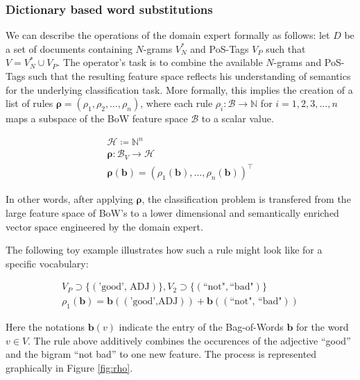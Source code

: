  
 

\subsubsection{Dictionary based word substitutions}

We can describe the operations of the domain expert formally as follows:
let $D$ be a set of documents containing $N$-grams $V_N^*$ and
PoS-Tags $V_P$ such that $V = V_N^* \cup V_P$.
The operator's task is to combine the available $N$-grams and PoS-Tags
such that the resulting feature space reflects his understanding
of semantics for the underlying classification task.
More formally, this implies the creation of a list of rules
$\boldsymbol{\rho} = (\rho_1, \rho_2, \ldots, \rho_n)$, where each rule $\rho_i:
\mathcal{B} \to \mathbb{N}$ for $i=1,2,3,\ldots,n$ maps a subspace of the BoW
feature space $\mathcal{B}$ to a scalar value.

\begin{eqnarray*}
\mathcal{H} \coloneqq \mathbb{N}^n \\
\boldsymbol\rho: \mathcal{B}_V \to \mathcal{H} \\
\boldsymbol{\rho}(\mathbf{b}) = (\rho_1(\mathbf{b}), \ldots,
\rho_n(\mathbf{b}))^\intercal
\end{eqnarray*}

In other words, after applying $\boldsymbol\rho$, the classification problem is
transfered from the large feature space of BoW's to a lower dimensional and
semantically enriched vector space engineered by the domain expert.

The following toy example illustrates how such a rule might look
like for a specific vocabulary:

\begin{equation*}
\begin{split}
V_P \supset \{(\text{'good', ADJ})\}, V_2 \supset \{(\text{``not"},
\text{``bad"})\}
\\
\rho_1(\mathbf{b}) = \mathbf{b}((\text{'good',ADJ})) +
\mathbf{b}((\text{``not", ``bad"}))
\end{split}
\end{equation*}

Here the notations $\mathbf{b}(v)$ indicate the entry of the Bag-of-Words
$\mathbf{b}$ for the word $v \in V$. The rule above additively combines the
occurences of the adjective ``good'' and the bigram ``not bad'' to one new
feature. The process is represented graphically in Figure \ref{fig:rho}.

